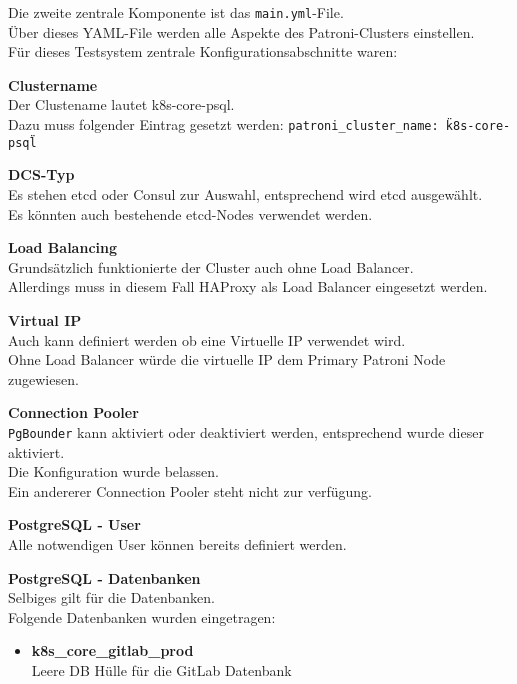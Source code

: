 \begin{flushleft}
    Die zweite zentrale Komponente ist das \texttt{main.yml}-File.\\
    Über dieses YAML-File werden alle Aspekte des Patroni-Clusters einstellen.\\
    Für dieses Testsystem zentrale Konfigurationsabschnitte waren:
    \begin{description}
        \item \textbf{Clustername}\hfill \\Der Clustename lautet \guillemotleft k8s-core-psql\guillemotright.\\Dazu muss folgender Eintrag gesetzt werden: \texttt{patroni\_cluster\_name: \"k8s-core-psql\"}
        \item \textbf{\Gls{DCS}-Typ}\hfill \\Es stehen \gls{etcd} oder \Gls{Consul} zur Auswahl, entsprechend wird \gls{etcd} ausgewählt.\\Es könnten auch bestehende \gls{etcd}-Nodes verwendet werden.
        \item \textbf{Load Balancing}\hfill \\Grundsätzlich funktionierte der Cluster auch ohne Load Balancer.\\Allerdings muss in diesem Fall \Gls{HAProxy} als Load Balancer eingesetzt werden.
        \item \textbf{Virtual IP}\hfill \\Auch kann definiert werden ob eine Virtuelle IP verwendet wird.\\Ohne Load Balancer würde die virtuelle IP dem Primary Patroni Node zugewiesen.
        \item \textbf{\Gls{Connection Pooler}}\hfill \\\texttt{PgBounder} kann aktiviert oder deaktiviert werden, entsprechend wurde dieser aktiviert.\\Die Konfiguration wurde belassen.\\Ein andererer \Gls{Connection Pooler} steht nicht zur verfügung.
        \item \textbf{PostgreSQL - User}\hfill \\Alle notwendigen User können bereits definiert werden.
        \item \textbf{PostgreSQL - Datenbanken}\hfill \\Selbiges gilt für die Datenbanken.\\Folgende Datenbanken wurden eingetragen:
        \begin{itemize}
            \item \textbf{k8s\_core\_gitlab\_prod}\hfill \\Leere DB Hülle für die \Gls{GitLab} Datenbank

\end{itemize}
\end{description}
\end{flushleft}
